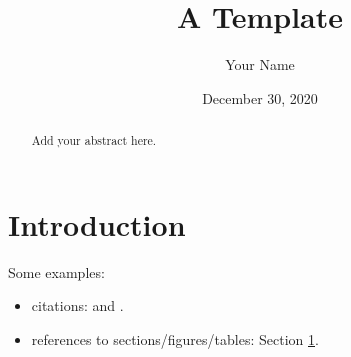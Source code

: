 \documentclass{article}
\title{A Template}
\author{Your Name}
\date{December 30, 2020}
\begin{document}
\maketitle

\begin{abstract}
    Add your abstract here.
\end{abstract}

\section{Introduction}
\label{sec:intro}
Some examples:
\begin{itemize}
    \item citations: \citep{cox1972regression} and \citet{cox1972regression}.
    \item references to sections/figures/tables: Section \ref{sec:intro}. 
\end{itemize}




\end{document}
